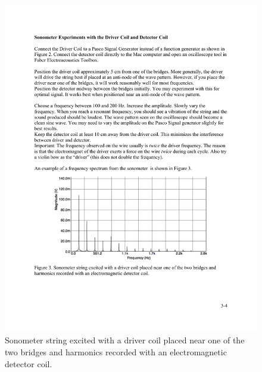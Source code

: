 \documentclass[11pt]{NSF}
\begin{document}
\begin{figure}[hbtp] 
\begin{center} 
\includegraphics[width=.8\textwidth]{fig3_3}
\caption{Sonometer string excited with a driver coil placed near one of the 
two bridges and harmonics recorded with an electromagnetic detector coil.}
\label{f:3} 
\end{center} 
\end{figure}
%
%
\end{document}
